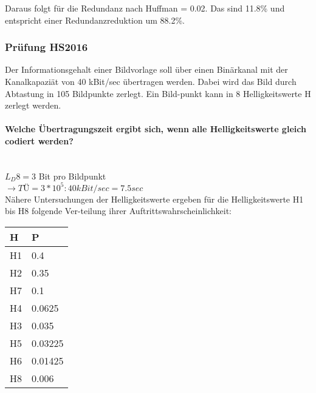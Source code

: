 Daraus folgt für die Redundanz nach Huffman = 0.02. 
Das sind 11.8\% und entspricht einer Redundanzreduktion um 88.2\%.

\subsubsection{Prüfung HS2016}
Der Informationsgehalt einer Bildvorlage soll über einen Binärkanal mit der Kanalkapaziät von 40 kBit/sec übertragen werden. Dabei wird das Bild durch Abtastung in 105 Bildpunkte zerlegt. Ein Bild-punkt kann in 8 Helligkeitswerte H zerlegt werden.

\paragraph{Welche Übertragungszeit ergibt sich, wenn alle Helligkeitswerte gleich codiert werden?}\mbox{}\\
$L_D 8=3$ Bit pro Bildpunkt\\
$\rightarrow TÜ = 3*10^5:40kBit/sec=7.5sec$\\

Nähere Untersuchungen der Helligkeitswerte ergeben für die Helligkeitswerte H1 bis H8 folgende Ver-teilung ihrer Auftrittswahrscheinlichkeit:
\begin{center}
    \centering
    \begin{tabular}{l | l}
        \bfseries{H} & \bfseries{P}\\ \hline
        H1 & 0.4\\ 
        H2 & 0.35\\
        H7 & 0.1\\
        H4 & 0.0625\\
        H3 & 0.035\\
        H5 & 0.03225\\
        H6 & 0.01425\\
        H8 & 0.006
    \end{tabular}
\end{center}

